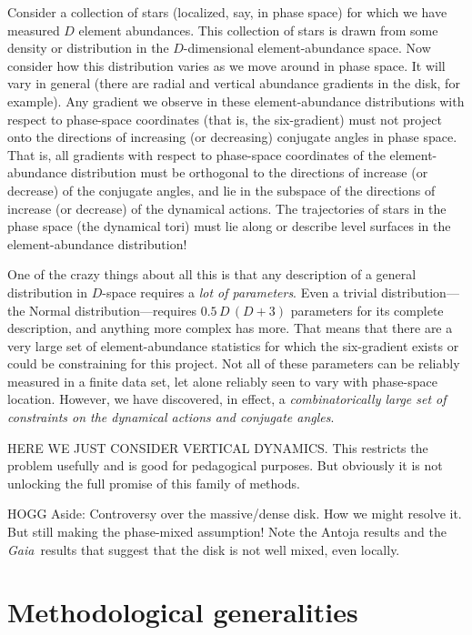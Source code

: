 \documentclass[modern]{aastex62}
\newcommand{\project}[1]{\textsl{#1}}
\newcommand{\gaia}{\project{Gaia}}
\begin{document}
Consider a collection of stars (localized, say, in phase space) for which we have
measured $D$ element abundances.
This collection of stars is drawn from some density or distribution in
the $D$-dimensional element-abundance space.
Now consider how this distribution varies as we move around in phase space.
It will vary in general (there are radial and vertical abundance gradients in the
disk, for example).
Any gradient we observe in these element-abundance distributions with respect to
phase-space coordinates (that is, the six-gradient) must not project
onto the directions of increasing (or decreasing) conjugate angles in phase space.
That is, all gradients with respect to phase-space coordinates
of the element-abundance distribution must be orthogonal to the
directions of increase (or decrease) of the conjugate angles, and lie in the subspace
of the directions of increase (or decrease) of the dynamical actions.
The trajectories of stars in the phase space (the dynamical tori) must lie along or
describe level surfaces in the element-abundance distribution!

One of the crazy things about all this is that any description of a general distribution in $D$-space
requires a \emph{lot of parameters}.
Even a trivial distribution---the Normal distribution---requires $0.5\,D\,(D+3)$ parameters for its
complete description, and anything more complex has more.
That means that there are a very large set of element-abundance statistics for which the
six-gradient exists or could be constraining for this project.
Not all of these parameters can be reliably measured in a finite data set,
let alone reliably seen to vary with phase-space location.
However,
we have discovered, in effect, a \emph{combinatorically large set of constraints on the
dynamical actions and conjugate angles}.

HERE WE JUST CONSIDER VERTICAL DYNAMICS.
This restricts the problem usefully and is good for pedagogical purposes.
But obviously it is not unlocking the full promise of this family of methods.

HOGG Aside: Controversy over the massive/dense disk. How we might resolve it.
But still making the phase-mixed assumption! Note the Antoja results and the \gaia\ results
that suggest that the disk is not well mixed, even locally.

\section{Methodological generalities}
\end{document}
